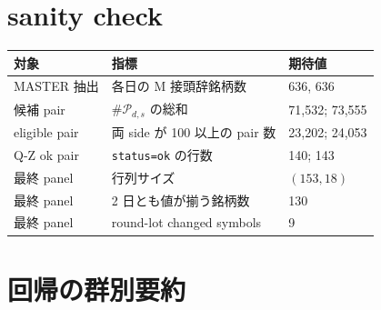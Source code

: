\documentclass[a4paper,11pt]{jlreq}
\begin{document}
\section{sanity check}

\begin{center}
\begin{tabular}{lll}
\toprule
対象 & 指標 & 期待値 \\
\midrule
MASTER 抽出 & 各日の M 接頭辞銘柄数 & 636, 636 \\
候補 pair & \(\#\mathcal{P}_{d,s}\) の総和 & 71,532; 73,555 \\
eligible pair & 両 side が 100 以上の pair 数 & 23,202; 24,053 \\
Q-Z ok pair & \texttt{status=ok} の行数 & 140; 143 \\
最終 panel & 行列サイズ & \((153,18)\) \\
最終 panel & 2 日とも値が揃う銘柄数 & 130 \\
最終 panel & round-lot changed symbols & 9 \\
\bottomrule
\end{tabular}
\end{center}

\section{回帰の群別要約}
\end{document}
